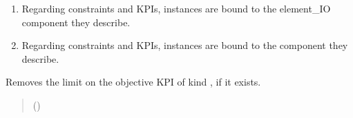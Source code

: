\documentclass[letterpaper,10pt,english]{sphinxmanual}
\begin{document}
\begin{fulllineitems}
\begin{fulllineitems}
\begin{enumerate}
\item {} 
\sphinxAtStartPar
Regarding constraints and KPIs,  instances are bound to the element\_IO component they describe.

\item {} 
\sphinxAtStartPar
Regarding constraints and KPIs,  instances are bound to the component they describe.

\end{enumerate}

\end{fulllineitems}


\begin{fulllineitems}
\label{\detokenize{generated/tamos.MILPModel:tamos.MILPModel.remove_max_KPI_constraint}}
\pysigstartsignatures
{}
\pysigstopsignatures
\sphinxAtStartPar
Removes the limit on the objective KPI of kind , if it exists.
\begin{quote}\begin{description}
\sphinxAtStartPar
{} (\sphinxstyleliteralemphasis{\sphinxupquote{, }}\sphinxstyleliteralemphasis{\sphinxupquote{, }}) \textendash{} 

\end{description}\end{quote}

\end{fulllineitems}



\end{fulllineitems}
\end{document}
